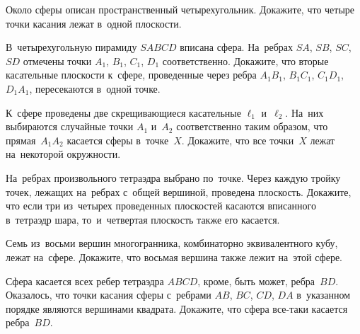 \begin{problems}

\item
Около сферы описан пространственный четырехугольник.
Докажите, что четыре точки касания лежат в~одной плоскости.

\item
В~четырехугольную пирамиду $SABCD$ вписана сфера.
На~ребрах $SA$, $SB$, $SC$, $SD$ отмечены точки $A_1$, $B_1$, $C_1$, $D_1$
соответственно.
Докажите, что вторые касательные плоскости к~сфере, проведенные через ребра
$A_{1}B_{1}$, $B_{1}C_{1}$, $C_{1}D_{1}$, $D_{1}A_{1}$, пересекаются в~одной
точке.

\item
К~сфере проведены две скрещивающиеся касательные $\ell_1$ и~$\ell_2$.
На~них выбираются случайные точки $A_1$ и~$A_2$ соответственно таким образом,
что прямая~$A_{1}A_{2}$ касается сферы в~точке~$X$.
Докажите, что все точки~$X$ лежат на~некоторой окружности.

\item
На~ребрах произвольного тетраэдра выбрано по~точке.
Через каждую тройку точек, лежащих на~ребрах с~общей вершиной, проведена
плоскость.
Докажите, что если три из~четырех проведенных плоскостей касаются вписанного
в~тетраэдр шара, то~и~четвертая плоскость также его касается.

\item
Семь из~восьми вершин многогранника, комбинаторно эквивалентного кубу, лежат
на~сфере.
Докажите, что восьмая вершина также лежит на~этой сфере.

\item
Сфера касается всех ребер тетраэдра $ABCD$, кроме, быть может, ребра~$BD$.
Оказалось, что точки касания сферы с~ребрами $AB$, $BC$, $CD$, $DA$ в~указанном
порядке являются вершинами квадрата.
Докажите, что сфера все-таки касается ребра~$BD$.

\end{problems}

